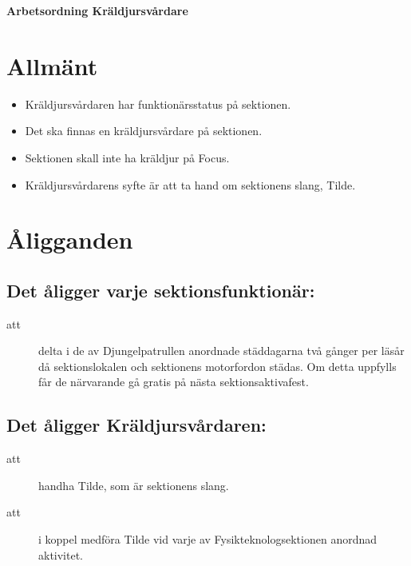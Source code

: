 

\renewcommand{\dateseparator}{-} %

\renewcommand{\forening}{Kräldjursvårdare}

\begin{center}
\LARGE{\textbf{Arbetsordning \forening}}
\end{center}


\section{Allmänt}
\begin{itemize}
\item Kräldjursvårdaren har funktionärsstatus på sektionen.

\item Det ska finnas en kräldjursvårdare på sektionen.

\item Sektionen skall inte ha kräldjur på Focus.

\item \forening ns syfte är att ta hand om sektionens slang, Tilde.

\end{itemize}

\section{Åligganden}
\subsection{Det åligger varje sektionsfunktionär:}
    \begin{description}
      \item[att] delta i de av Djungelpatrullen anordnade städdagarna två gånger per
      läsår då sektionslokalen och sektionens motorfordon städas. Om detta uppfylls får de närvarande gå gratis på nästa
      sektionsaktivafest.
    \end{description}
\subsection{Det åligger Kräldjursvårdaren:}
\begin{description}
      \item[att] handha Tilde, som är sektionens slang.
      \item[att] i koppel medföra Tilde vid varje av Fysikteknologsektionen anordnad aktivitet.
    \end{description}


